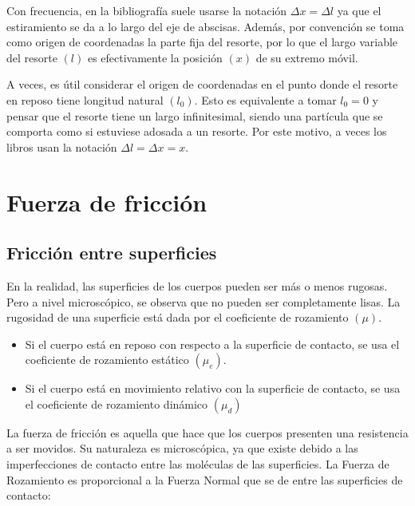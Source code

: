 \documentclass[a5paper,12pt,twoside]{book}
\begin{document}
Con frecuencia, en la bibliografía suele usarse la notación $\Delta x=\Delta l$ ya que el estiramiento se da a lo largo del eje de abscisas.
Además, por convención se toma como origen de coordenadas la parte fija del resorte, por lo que el largo variable del resorte $(l)$ es efectivamente la posición $(x)$ de su extremo móvil.

A veces, es útil considerar el origen de coordenadas en el punto donde el resorte en reposo tiene longitud natural $(l_0)$.
Esto es equivalente a tomar $l_0 = 0$ y pensar que el resorte tiene un largo infinitesimal, siendo una partícula que se comporta como si estuviese adosada a un resorte.
Por este motivo, a veces los libros usan la notación $\Delta l = \Delta x = x$.


\section{Fuerza de fricción}

\subsection{Fricción entre superficies}

En la realidad, las superficies de los cuerpos pueden ser más o menos rugosas.
Pero a nivel microscópico, se observa que no pueden ser completamente lisas.
La rugosidad de una superficie está dada por el coeficiente de rozamiento $(\mu)$.

\begin{itemize}
    \item  Si el cuerpo está en reposo con respecto a la superficie de contacto, se usa el coeficiente de rozamiento   estático $(\mu_e)$.
    
    \item Si el cuerpo está en movimiento relativo con la superficie de contacto, se usa el coeficiente de rozamiento   dinámico $(\mu_d)$
\end{itemize}

\begin{center}
    \def\svgwidth{0.8\linewidth}
    
\end{center}

La fuerza de fricción es aquella que hace que los cuerpos presenten una resistencia a ser movidos.
Su naturaleza es microscópica, ya que existe debido a las imperfecciones de contacto entre las moléculas de las superficies.
La Fuerza de Rozamiento es proporcional a la Fuerza Normal que se de entre las superficies de contacto:
\end{document}

